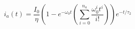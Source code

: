 \begin{equation}
    i_a \left( t \right) = \frac{I_0}{\eta} \left ( 1 - e^{-\omega_0 t} \left ( \sum\limits_{i=0}^{n_a} \frac{\omega_0^i t^i}{i!} \right ) \right ) e^{-t/\tau_2}
    \label{eqn:approx}
\end{equation}
